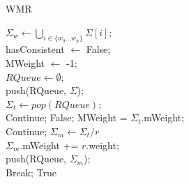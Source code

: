 \IncMargin{1em}
\begin{algorithm}\label{alg_prqa}
	{\small
		\caption{WMR}
		
		{
			$\Sigma_w \leftarrow \bigcup_{i\in \{w_0\dots w_n\}}\Sigma[i]$;\\
			hasConsistent $\leftarrow$ False;\\
			MWeight $\leftarrow$ -1;\\
			$RQueue \leftarrow \emptyset$;\\
			push(RQueue, $\Sigma$);\\
			{
				$\Sigma_t \leftarrow pop(RQueue)$;\\
				{
					Continue;
				}							
				{
					{
						\Return False;
					}
					MWeight = $\Sigma_t$.mWeight;\\
					Continue;
				}
				{
					$\Sigma_m \leftarrow \Sigma_t / r$\\
					$\Sigma_m$.mWeight += $r$.weight;\\ 
					push(RQueue, $\Sigma_m$);\\
				}  
			}
			{
				Break;
			} 
		}
		\Return True
	}
	\vspace*{-1mm}
\end{algorithm}
\DecMargin{1em}
